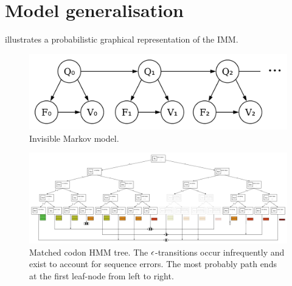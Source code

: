 \section{Model generalisation}

 illustrates a probabilistic graphical representation of the IMM.\@

\begin{figure}[htbp]
\centering
\includegraphics[width=.45\linewidth]{figure/imm}
\caption{Invisible Markov model.}%
\label{fig:imm}
\end{figure}

\newpage
\newpage

\begin{figure}
    \centering
    \includegraphics[scale=0.9]{figure/codon-hmm-tree}
    \caption{Matched codon HMM tree.
        The $\epsilon$-transitions occur infrequently and exist to account for sequence errors.
        The most probably path ends at the first leaf-node from left to right.}\label{fig:codon-hmm-tree}
\end{figure}
